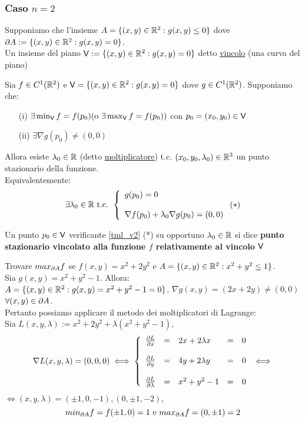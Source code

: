 \subsubsection{Caso $n=2$}
 Supponiamo che l'insieme $A=\{(x,y)\in \mathbb{R}^2 : g(x,y)\leq 0\}$ dove $\partial A := \{(x,y)\in \mathbb{R}^2 : g(x,y) = 0\}$. \\
 Un insieme del piano $\mathsf{V} := \{(x,y)\in \mathbb{R}^2  : g(x,y)=0\}$ \ace detto \underline{vincolo} (\ace una curva del piano)
\begin{theorem}
  Sia $f \in C^1(\mathbb{R}^2)$ e $\mathsf{V} = \{(x,y)\in \mathbb{R}^2 : g(x,y) = 0\}$ dove $g \in C^1(\mathbb{R}^2)$. Supponiamo che:
  \begin{enumerate}
    \item[(i)] $\exists \min_{\mathsf{V}} f = f(p_0) (\text{o } \exists \max_{\mathsf{V}} f = f(p_0))$ con $p_0 = (x_0,y_0) \in \mathsf{V}$
    \item[(ii)] $\exists \nabla g(p_0) \not = (0,0)$
  \end{enumerate}
  Allora esiste $\lambda_0 \in \mathbb{R}$ (detto \underline{moltiplicatore}) t.c. $(x_0,y_0,\lambda_0)\in \mathbb{R}^3$ \ace un 
  punto stazionario della funzione. \\
  Equivalentemente: $$\exists\lambda_0 \in \mathbb{R} \text{ t.c. } \left\{\begin{array}{l}
    g(p_0) = 0 \\
    \\
    \nabla f(p_0) + \lambda_0 \nabla g(p_0) = (0,0) \\
  \end{array}\right. (*)  \label{tml_v2}$$
\end{theorem}
\begin{definition}
  Un punto $p_0 \in \mathsf{V}$ verificante \ref{tml_v2} (*) su opportuno $\lambda_0 \in \mathbb{R}$ si dice 
  \textbf{punto stazionario vincolato alla funzione $f$ relativamente al vincolo $\mathsf{V}$}
\end{definition}
\begin{example}
  Trovare $max_{\partial A} f$ se $f(x,y) = x^2+2y^2$ e $A = \{(x,y)\in \mathbb{R}^2 : x^2+y^2 \leq 1\}$. \\
  Sia $g(x,y) = x^2+y^2-1$. Allora: \\
  $A = \{(x,y)\in \mathbb{R}^2 : g(x,y) = x^2+y^2-1=0\}$, $\nabla g(x,y) = (2x+2y) \neq (0,0)$ $\forall (x,y)\in \partial A$. \\
  Pertanto possiamo applicare il metodo dei moltiplicatori di Lagrange:\\
  Sia $L(x,y,\lambda) := x^2+2y^2+\lambda(x^2+y^2-1)$, 
  $$\nabla L(x,y,\lambda) = (0,0,0) \iff \left\{\begin{array}{lclcl}
    \frac{\partial L}{\partial x} & = & 2x+2\lambda x & = & 0 \\
    \\
    \frac{\partial L}{\partial y} & = & 4y+2\lambda y & = & 0 \\
    \\
    \frac{\partial L}{\partial \lambda} & = & x^2 + y^2 - 1 & = & 0 \\
  \end{array}\right. \iff $$
  $\iff (x,y,\lambda)=(\pm 1, 0, -1), (0,\pm 1,-2)$,
  $$min_{\partial A}f = f(\pm 1, 0) = 1 \text{ e } max_{\partial A} f = (0,\pm 1) = 2$$
\end{example}
